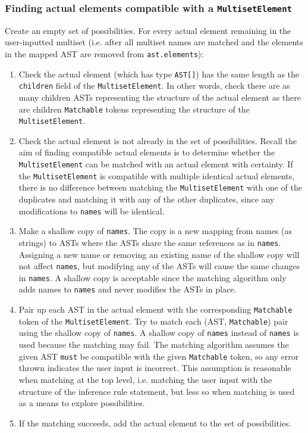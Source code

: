 \subsubsection{Finding actual elements compatible with a \texorpdfstring{\lstinline{MultisetElement}}{MultisetElement}}
Create an empty set of possibilities. For every actual element remaining in the user-inputted multiset (i.e. after all multiset names are matched and the elements in the mapped AST are removed from \lstinline{ast.elements}):
\begin{enumerate}
    \item Check the actual element (which has type \lstinline{AST[]}) has the same length as the \lstinline{children} field of the \lstinline{MultisetElement}. In other words, check there are as many children ASTs representing the structure of the actual element as there are children \lstinline{Matchable} tokens representing the structure of the \lstinline{MultisetElement}.
    \item Check the actual element is not already in the set of possibilities. Recall the aim of finding compatible actual elements is to determine whether the \lstinline{MultisetElement} can be matched with an actual element with certainty. If the \lstinline{MultisetElement} is compatible with multiple identical actual elements, there is no difference between matching the \lstinline{MultisetElement} with one of the duplicates and matching it with any of the other duplicates, since any modifications to \lstinline{names} will be identical.
    \item Make a shallow copy of \lstinline{names}. The copy is a new mapping from names (as strings) to ASTs where the ASTs share the same references as in \lstinline{names}. Assigning a new name or removing an existing name of the shallow copy will not affect \lstinline{names}, but modifying any of the ASTs will cause the same changes in \lstinline{names}. A shallow copy is acceptable since the matching algorithm only adds names to \lstinline{names} and never modifies the ASTs in place.
    \item Pair up each AST in the actual element with the corresponding \lstinline{Matchable} token of the \lstinline{MultisetElement}. Try to match each (AST, \lstinline{Matchable}) pair using the shallow copy of \lstinline{names}. A shallow copy of \lstinline{names} instead of \lstinline{names} is used because the matching may fail. The matching algorithm assumes the given AST \lstinline{must} be compatible with the given \lstinline{Matchable} token, so any error thrown indicates the user input is incorrect. This assumption is reasonable when matching at the top level, i.e. matching the user input with the structure of the inference rule statement, but less so when matching is used as a means to explore possibilities.
    \item If the matching succeeds, add the actual element to the set of possibilities.
\end{enumerate}

